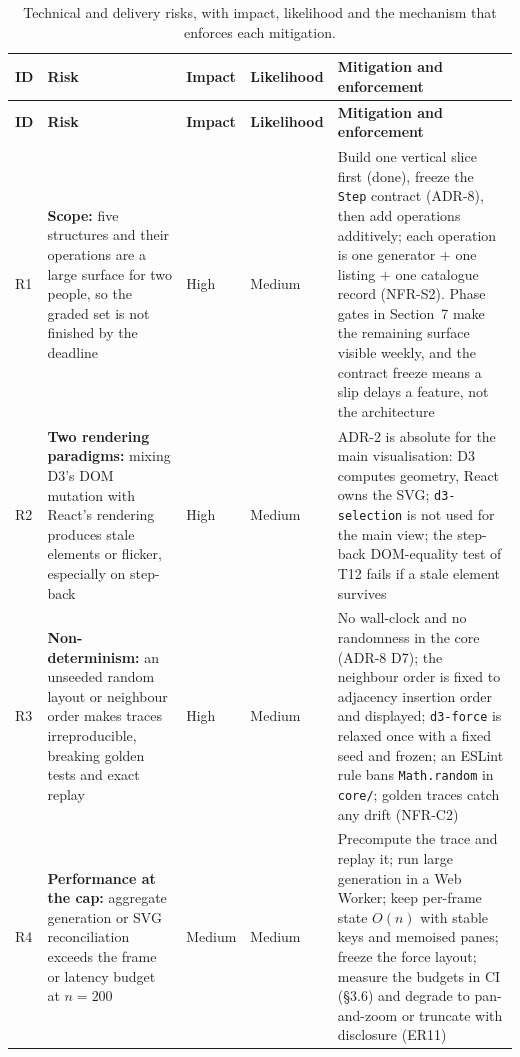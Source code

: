 \documentclass[11pt,a4paper]{article}
\newcommand{\ct}[1]{\texttt{#1}}
\begin{document}
{\footnotesize
\setlength{\tabcolsep}{4pt}
\begin{longtable}{@{}L{0.8cm}L{3.5cm}L{1.3cm}L{1.3cm}L{6.6cm}@{}}
\caption{Technical and delivery risks, with impact, likelihood and the mechanism that enforces
each mitigation.}\label{tab:risks}\\
\toprule
\textbf{ID} & \textbf{Risk} & \textbf{Impact} & \textbf{Likelihood} & \textbf{Mitigation and enforcement} \\
\midrule
\endfirsthead
\toprule
\textbf{ID} & \textbf{Risk} & \textbf{Impact} & \textbf{Likelihood} & \textbf{Mitigation and enforcement} \\
\midrule
\endhead
\bottomrule
\endlastfoot
R1 & \textbf{Scope:} five structures and their operations are a large surface for two people,
so the graded set is not finished by the deadline & High & Medium & Build one vertical slice
first (done), freeze the \ct{Step} contract (ADR-8), then add operations additively; each
operation is one generator \(+\)
one listing \(+\)
one catalogue record (NFR-S2). Phase gates in Section~7 make the remaining surface visible
weekly, and the contract freeze means a slip delays a feature, not the architecture \\
R2 & \textbf{Two rendering paradigms:} mixing D3's DOM mutation with React's rendering
produces stale elements or flicker, especially on step-back & High & Medium & ADR-2 is
absolute for the main visualisation: D3 computes geometry, React owns the SVG; \ct{d3-selection}
is not used for the main view; the step-back DOM-equality test of T12 fails if a stale element
survives \\
R3 & \textbf{Non-determinism:} an unseeded random layout or neighbour order makes traces
irreproducible, breaking golden tests and exact replay & High & Medium & No wall-clock and no
randomness in the core (ADR-8 D7); the neighbour order is fixed to adjacency insertion order
and displayed; \ct{d3-force} is relaxed once with a fixed seed and frozen; an ESLint rule bans
\ct{Math.random} in \ct{core/}; golden traces catch any drift (NFR-C2) \\
R4 & \textbf{Performance at the cap:} aggregate generation or SVG reconciliation exceeds the
frame or latency budget at $n = 200$ & Medium & Medium & Precompute the trace and replay it;
run large generation in a Web Worker; keep per-frame state $O(n)$ with stable keys and
memoised panes; freeze the force layout; measure the budgets in CI (\S3.6) and degrade to
pan-and-zoom or truncate with disclosure (ER11) \\

\end{longtable}}
\end{document}
